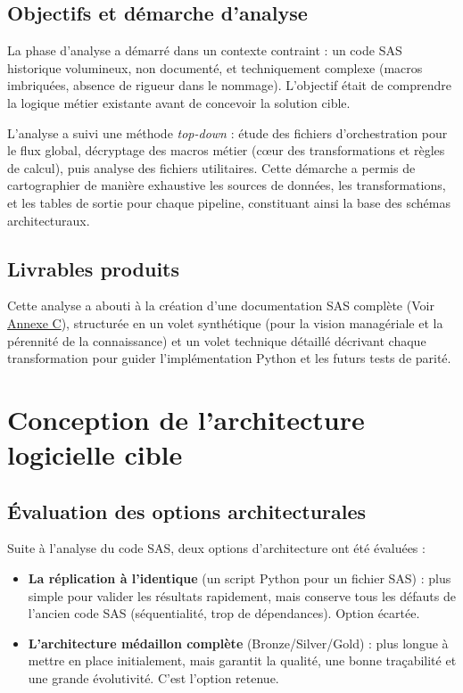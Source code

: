 \subsection{Objectifs et démarche d'analyse}

La phase d'analyse a démarré dans un contexte contraint : un code SAS historique volumineux, non documenté, et techniquement complexe (macros imbriquées, absence de rigueur dans le nommage). L'objectif était de comprendre la logique métier existante avant de concevoir la solution cible.

L'analyse a suivi une méthode \textit{top-down} : étude des fichiers d'orchestration pour le flux global, décryptage des macros métier (cœur des transformations et règles de calcul), puis analyse des fichiers utilitaires. Cette démarche a permis de cartographier de manière exhaustive les sources de données, les transformations, et les tables de sortie pour chaque pipeline, constituant ainsi la base des schémas architecturaux.

\subsection{Livrables produits}

Cette analyse a abouti à la création d'une documentation SAS complète (Voir \hyperlink{annexe.C}{Annexe C}), structurée en un volet synthétique (pour la vision managériale et la pérennité de la connaissance) et un volet technique détaillé décrivant chaque transformation pour guider l'implémentation Python et les futurs tests de parité.

\section{Conception de l'architecture logicielle cible}

\subsection{Évaluation des options architecturales}

Suite à l'analyse du code SAS, deux options d'architecture ont été évaluées :

\begin{itemize}
    \item \textbf{La réplication à l'identique} (un script Python pour un fichier SAS) : plus simple pour valider les résultats rapidement, mais conserve tous les défauts de l'ancien code SAS (séquentialité, trop de dépendances). Option écartée.
    \item \textbf{L'architecture médaillon complète} (Bronze/Silver/Gold) : plus longue à mettre en place initialement, mais garantit la qualité, une bonne traçabilité et une grande évolutivité. C'est l'option retenue.
\end{itemize}

